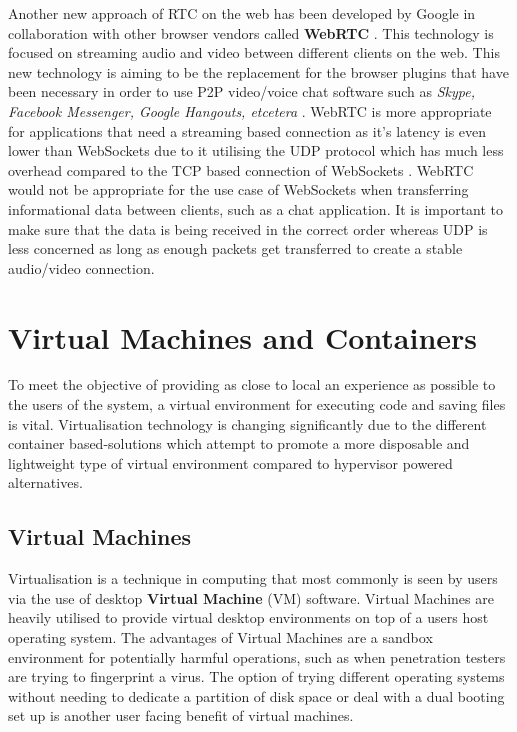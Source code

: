 Another new approach of RTC on the web has been developed by Google in collaboration with other browser vendors called \textbf{WebRTC} \cite{webrtc}. This technology is focused on streaming audio and video between different clients on the web. This new technology is aiming to be the replacement for the browser plugins that have been necessary in order to use P2P video/voice chat software such as \textit{Skype, Facebook Messenger, Google Hangouts, etcetera} \cite{webrtc}. WebRTC is more appropriate for applications that need a streaming based connection as it's latency is even lower than WebSockets due to it utilising the UDP protocol which has much less overhead compared to the TCP based connection of WebSockets \cite{udpvstcp}. WebRTC would not be appropriate for the use case of WebSockets when transferring informational data between clients, such as a chat application. It is important to make sure that the data is being received in the correct order whereas UDP is less concerned as long as enough packets get transferred to create a stable audio/video connection.

\section{Virtual Machines and Containers} \label{lit-containers}

To meet the objective of providing as close to local an experience as possible to the users of the system, a virtual environment for executing code and saving files is vital. Virtualisation technology is changing significantly due to the different container based-solutions which attempt to promote a more disposable and lightweight type of virtual environment compared to  hypervisor powered alternatives.

\subsection{Virtual Machines}

Virtualisation is a technique in computing that most commonly is seen by users via the use of desktop \textbf{Virtual Machine} (VM) software. Virtual Machines are heavily utilised to provide virtual desktop environments on top of a users host operating system. The advantages of Virtual Machines are a sandbox environment for potentially harmful operations, such as when penetration testers are trying to fingerprint a virus. The option of trying different operating systems without needing to dedicate a partition of disk space or deal with a dual booting set up is another user facing benefit of virtual machines.


